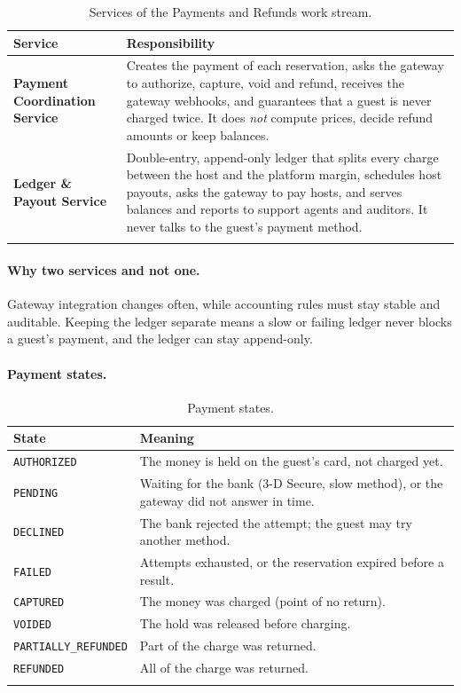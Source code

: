 \begin{longtable}{@{}L{3.0cm}L{10.8cm}@{}}
\toprule
\textbf{Service} & \textbf{Responsibility} \\
\midrule
\endhead
\textbf{Payment Coordination Service} &
  Creates the payment of each reservation, asks the gateway to authorize,
  capture, void and refund, receives the gateway webhooks, and guarantees
  that a guest is never charged twice. It does \emph{not} compute prices,
  decide refund amounts or keep balances. \\
\addlinespace
\textbf{Ledger \& Payout Service} &
  Double-entry, append-only ledger that splits every charge between the host
  and the platform margin, schedules host payouts, asks the gateway to pay
  hosts, and serves balances and reports to support agents and auditors. It
  never talks to the guest's payment method. \\
\bottomrule
\caption{Services of the Payments and Refunds work stream.}
\label{tab:pay-services}
\end{longtable}

\paragraph{Why two services and not one.} Gateway integration changes often,
while accounting rules must stay stable and auditable. Keeping the ledger
separate means a slow or failing ledger never blocks a guest's payment, and
the ledger can stay append-only.

\paragraph{Payment states.}
\begin{longtable}{@{}L{4.2cm}L{9.6cm}@{}}
\toprule
\textbf{State} & \textbf{Meaning} \\
\midrule
\endhead
\texttt{AUTHORIZED} & The money is held on the guest's card, not charged yet. \\
\texttt{PENDING} & Waiting for the bank (3-D Secure, slow method), or the gateway did not answer in time. \\
\texttt{DECLINED} & The bank rejected the attempt; the guest may try another method. \\
\texttt{FAILED} & Attempts exhausted, or the reservation expired before a result. \\
\texttt{CAPTURED} & The money was charged (point of no return). \\
\texttt{VOIDED} & The hold was released before charging. \\
\texttt{PARTIALLY\_\allowbreak REFUNDED} & Part of the charge was returned. \\
\texttt{REFUNDED} & All of the charge was returned. \\
\bottomrule
\caption{Payment states.}
\label{tab:pay-states}
\end{longtable}

